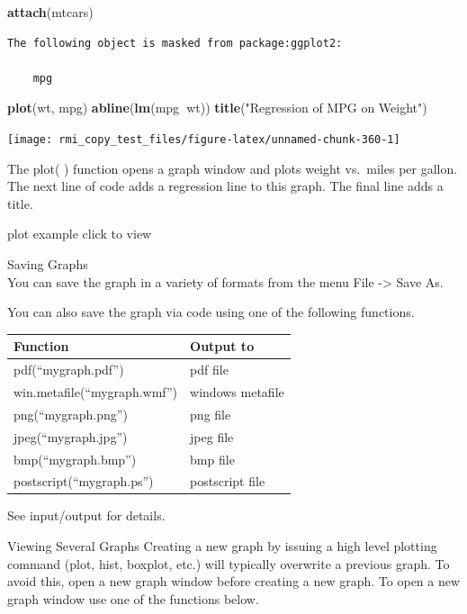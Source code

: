 \documentclass[]{book}
\newenvironment{Shaded}{\begin{snugshade}}{\end{snugshade}}
\newcommand{\KeywordTok}[1]{\textcolor[rgb]{0.13,0.29,0.53}{\textbf{#1}}}
\newcommand{\StringTok}[1]{\textcolor[rgb]{0.31,0.60,0.02}{#1}}
\newcommand{\OperatorTok}[1]{\textcolor[rgb]{0.81,0.36,0.00}{\textbf{#1}}}
\newcommand{\NormalTok}[1]{#1}
\theoremstyle{definition}
\theoremstyle{definition}
\theoremstyle{definition}
\theoremstyle{remark}
\begin{document}
\begin{Shaded}
\begin{Highlighting}[]
\KeywordTok{attach}\NormalTok{(mtcars)}
\end{Highlighting}
\end{Shaded}

\begin{verbatim}
The following object is masked from package:ggplot2:

    mpg
\end{verbatim}

\begin{Shaded}
\begin{Highlighting}[]
\KeywordTok{plot}\NormalTok{(wt, mpg) }
\KeywordTok{abline}\NormalTok{(}\KeywordTok{lm}\NormalTok{(mpg}\OperatorTok{~}\NormalTok{wt))}
\KeywordTok{title}\NormalTok{(}\StringTok{"Regression of MPG on Weight"}\NormalTok{)}
\end{Highlighting}
\end{Shaded}

\begin{center}\texttt{[image: rmi\_copy\_test\_files/figure-latex/unnamed-chunk-360-1]} \end{center}

The plot( ) function opens a graph window and plots weight vs.~miles per
gallon. The next line of code adds a regression line to this graph. The
final line adds a title.

plot example click to view

Saving Graphs\\
You can save the graph in a variety of formats from the menu File
-\textgreater{} Save As.

You can also save the graph via code using one of the following
functions.

\begin{longtable}[]{@{}ll@{}}
\toprule
Function & Output to\tabularnewline
\midrule
\endhead
pdf(``mygraph.pdf'') & pdf file\tabularnewline
win.metafile(``mygraph.wmf'') & windows metafile\tabularnewline
png(``mygraph.png'') & png file\tabularnewline
jpeg(``mygraph.jpg'') & jpeg file\tabularnewline
bmp(``mygraph.bmp'') & bmp file\tabularnewline
postscript(``mygraph.ps'') & postscript file\tabularnewline
\bottomrule
\end{longtable}

See input/output for details.

Viewing Several Graphs Creating a new graph by issuing a high level
plotting command (plot, hist, boxplot, etc.) will typically overwrite a
previous graph. To avoid this, open a new graph window before creating a
new graph. To open a new graph window use one of the functions below.
\end{document}
